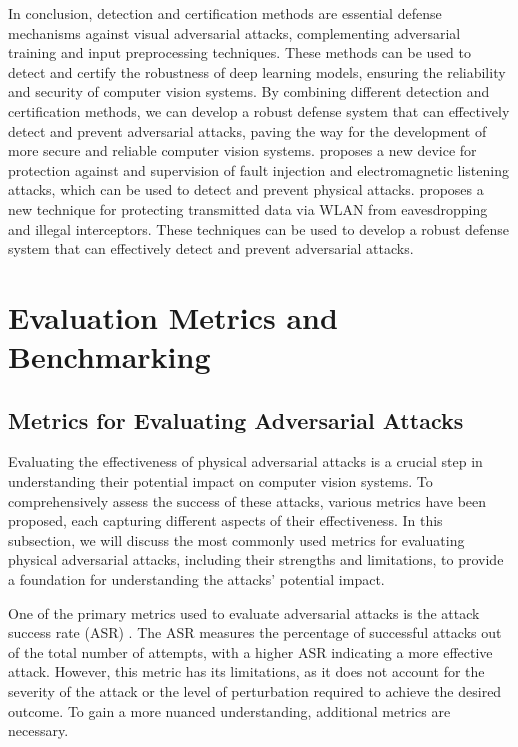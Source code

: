 \documentclass[11pt]{article}
\begin{document}
In conclusion, detection and certification methods are essential defense mechanisms against visual adversarial attacks, complementing adversarial training and input preprocessing techniques. These methods can be used to detect and certify the robustness of deep learning models, ensuring the reliability and security of computer vision systems. By combining different detection and certification methods, we can develop a robust defense system that can effectively detect and prevent adversarial attacks, paving the way for the development of more secure and reliable computer vision systems. \cite{ref98} proposes a new device for protection against and supervision of fault injection and electromagnetic listening attacks, which can be used to detect and prevent physical attacks. \cite{ref99} proposes a new technique for protecting transmitted data via WLAN from eavesdropping and illegal interceptors. These techniques can be used to develop a robust defense system that can effectively detect and prevent adversarial attacks.

\section{Evaluation Metrics and Benchmarking}

\subsection{Metrics for Evaluating Adversarial Attacks}

Evaluating the effectiveness of physical adversarial attacks is a crucial step in understanding their potential impact on computer vision systems. To comprehensively assess the success of these attacks, various metrics have been proposed, each capturing different aspects of their effectiveness. In this subsection, we will discuss the most commonly used metrics for evaluating physical adversarial attacks, including their strengths and limitations, to provide a foundation for understanding the attacks' potential impact.

One of the primary metrics used to evaluate adversarial attacks is the attack success rate (ASR) \cite{ref100}. The ASR measures the percentage of successful attacks out of the total number of attempts, with a higher ASR indicating a more effective attack. However, this metric has its limitations, as it does not account for the severity of the attack or the level of perturbation required to achieve the desired outcome. To gain a more nuanced understanding, additional metrics are necessary.
\end{document}

